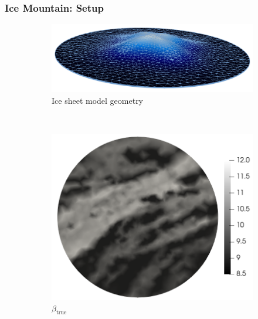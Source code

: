 \documentclass[10pt,final,xcolor=dvipsnames]{beamer}
\begin{document}
\begin{frame}
	\frametitle{Ice Mountain: Setup}
	\begin{figure}
		\begin{center} 
			\begin{subfigure}{0.99\textwidth}
				\begin{center} 
					\includegraphics[scale=0.2]{meshHeight_view2_edges.png}
				\end{center}
				\caption{Ice sheet model geometry}
				\label{fig:ice_mountain_mesh}
			\end{subfigure} \\
			\begin{subfigure}{0.49\textwidth}
				\includegraphics[scale=0.2]{mtrue_withColorBar.png}
				\caption{$\beta_\text{true}$}
				\label{fig:true_beta}
			\end{subfigure}
			\begin{subfigure}{0.49\textwidth}

\end{subfigure}
\end{center}
\end{figure}
\end{frame}
\end{document}
